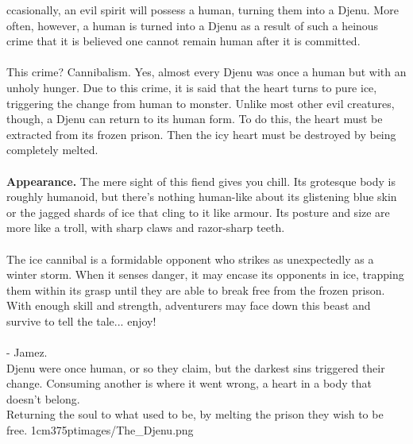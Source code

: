 \documentclass[letterpaper,openany,oneside,twocolumn]{book}
\begin{document}

\mainmatter%


\entryfont \noindent {}ccasionally, an evil spirit will possess a human, turning them into a Djenu. More often, however, a human is turned into a Djenu as a result of such a heinous crime that it is believed one cannot remain human after it is committed.\\\\
This crime? Cannibalism. Yes, almost every Djenu was once a human but with an unholy hunger. Due to this crime, it is said that the heart turns to pure ice, triggering the change from human to monster. Unlike most other evil creatures, though, a Djenu can return to its human form. To do this, the heart must be extracted from its frozen prison. Then the icy heart must be destroyed by being completely melted.\\\\
\textbf{Appearance.} The mere sight of this fiend gives you chill. Its grotesque body is roughly humanoid, but there's nothing human-like about its glistening blue skin or the jagged shards of ice that cling to it like armour. Its posture and size are more like a troll, with sharp claws and razor-sharp teeth.\\\\
The ice cannibal is a formidable opponent who strikes as unexpectedly as a winter storm. When it senses danger, it may encase its opponents in ice, trapping them within its grasp until they are able to break free from the frozen prison. With enough skill and strength, adventurers may face down this beast and survive to tell the tale... enjoy!\\\\
- Jamez.\\

%
{%
	Djenu were once human, or so they claim, but the darkest sins triggered their change. Consuming another is where it went wrong, a heart in a body that doesn't belong.\\ Returning the soul to what used to be, by melting the prison they wish to be free.%
}{1cm}{375pt}{images/The_Djenu.png}%

\vfill\eject
\end{document}
